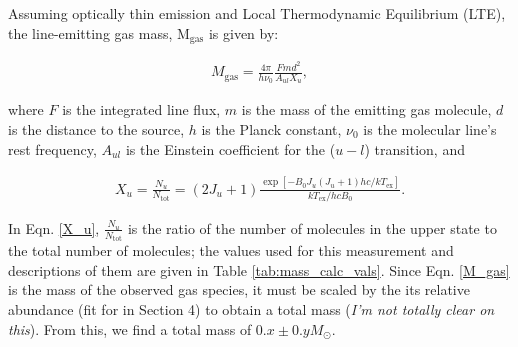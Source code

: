 Assuming optically thin emission and Local Thermodynamic Equilibrium (LTE), the line-emitting gas mass, M$_{\text{gas}}$ is given by:

\begin{align}
  M_{\text{gas}}= \frac{4 \pi}{h \nu_0} \frac{F m d^2}{A_{ul} X_u},
  \label{M_gas}
\end{align}

where $F$ is the integrated line flux, $m$ is the mass of the emitting gas molecule, $d$ is the distance to the source, $h$ is the Planck constant, $\nu_0$ is the molecular line's rest frequency, $A_{ul}$ is the Einstein coefficient for the ($u - l$) transition, and

\begin{align}
  X_u = \frac{N_u}{N_{\text{tot}}} = (2 J_u + 1) \frac{\exp [-B_0 J_u (J_u + 1) h c/kT_{\text{ex}}]}{kT_{\text{ex}}/hc B_0}.
  \label{X_u}
\end{align}

In Eqn. \ref{X_u}, $\frac{N_u}{N_{\text{tot}}}$ is the ratio of the number of molecules in the upper state to the total number of molecules; the values used for this measurement and descriptions of them are given in Table \ref{tab:mass_calc_vals}. Since Eqn. \ref{M_gas} is the mass of the observed gas species, it must be scaled by the its relative abundance (fit for in Section 4) to obtain a total mass (\textit{I'm not totally clear on this}). From this, we find a total mass of $0.x \pm 0.y M_{\odot}$.


